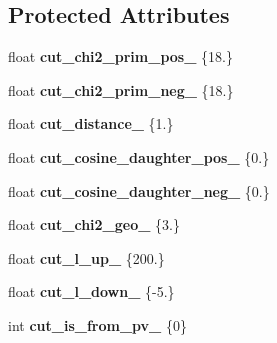 \subsection*{Protected Attributes}
\begin{DoxyCompactItemize}
\item 
float {\bfseries cut\+\_\+chi2\+\_\+prim\+\_\+pos\+\_\+} \{18.\}\hypertarget{classCutsContainer_ab7750a33358038a8833bc53475a5c497}{}\label{classCutsContainer_ab7750a33358038a8833bc53475a5c497}

\item 
float {\bfseries cut\+\_\+chi2\+\_\+prim\+\_\+neg\+\_\+} \{18.\}\hypertarget{classCutsContainer_aa116eee7ffdda25ad4563c02792d5d82}{}\label{classCutsContainer_aa116eee7ffdda25ad4563c02792d5d82}

\item 
float {\bfseries cut\+\_\+distance\+\_\+} \{1.\}\hypertarget{classCutsContainer_ac4dc4851a0c8025cb8ac73ad718496f9}{}\label{classCutsContainer_ac4dc4851a0c8025cb8ac73ad718496f9}

\item 
float {\bfseries cut\+\_\+cosine\+\_\+daughter\+\_\+pos\+\_\+} \{0.\}\hypertarget{classCutsContainer_a87cfe2fe82f5b81234b601f3f91e339e}{}\label{classCutsContainer_a87cfe2fe82f5b81234b601f3f91e339e}

\item 
float {\bfseries cut\+\_\+cosine\+\_\+daughter\+\_\+neg\+\_\+} \{0.\}\hypertarget{classCutsContainer_a356f309acd0b03d46996b07e6c15d1a4}{}\label{classCutsContainer_a356f309acd0b03d46996b07e6c15d1a4}

\item 
float {\bfseries cut\+\_\+chi2\+\_\+geo\+\_\+} \{3.\}\hypertarget{classCutsContainer_a45a43a34740f7046d7ea06937ab8299f}{}\label{classCutsContainer_a45a43a34740f7046d7ea06937ab8299f}

\item 
float {\bfseries cut\+\_\+l\+\_\+up\+\_\+} \{200.\}\hypertarget{classCutsContainer_a6c642639b29e454a9ec007b861af9a89}{}\label{classCutsContainer_a6c642639b29e454a9ec007b861af9a89}

\item 
float {\bfseries cut\+\_\+l\+\_\+down\+\_\+} \{-\/5.\}\hypertarget{classCutsContainer_af26a2c73ad6d7dcd4052aa38ea50e624}{}\label{classCutsContainer_af26a2c73ad6d7dcd4052aa38ea50e624}

\item 
int {\bfseries cut\+\_\+is\+\_\+from\+\_\+pv\+\_\+} \{0\}\hypertarget{classCutsContainer_a27149dc50a38ea6b26e6a3e3faff6808}{}\label{classCutsContainer_a27149dc50a38ea6b26e6a3e3faff6808}


\end{DoxyCompactItemize}

